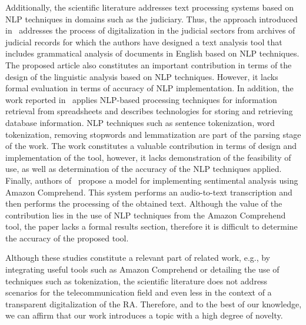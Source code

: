 Additionally, the scientific literature addresses text processing systems based on NLP techniques in domains such as the judiciary. Thus, the approach introduced in~\cite{8487847} addresses the process of digitalization in the judicial sectors from archives of judicial records for which the authors have designed a text analysis tool that includes grammatical analysis of documents in English based on NLP techniques. The proposed article also constitutes an important contribution in terms of the design of the linguistic analysis based on NLP techniques. However, it lacks formal evaluation in terms of accuracy of NLP implementation. In addition, the work reported in~\cite{9138070} applies NLP-based processing techniques for information retrieval from spreadsheets and describes technologies for storing and retrieving database information. NLP techniques such as sentence tokenization, word tokenization, removing stopwords and lemmatization are part of the parsing stage of the work. The work constitutes a valuable contribution in terms of design and implementation of the tool, however, it lacks demonstration of the feasibility of use, as well as determination of the accuracy of the NLP techniques applied. Finally, authors of~\cite{9104105} propose a model for implementing sentimental analysis using Amazon Comprehend. This system performs an audio-to-text transcription and then performs the processing of the obtained text. Although the value of the contribution lies in the use of NLP techniques from the Amazon Comprehend tool, the paper lacks a formal results section, therefore it is difficult to determine the accuracy of the proposed tool. 

Although these studies constitute a relevant part of related work, e.g., by integrating useful tools such as Amazon Comprehend or detailing the use of techniques such as tokenization, the scientific literature does not address scenarios for the telecommunication field and even less in the context of a transparent digitalization of the RA. Therefore, and to the best of our knowledge, we can affirm that our work introduces a topic with a high degree of novelty.